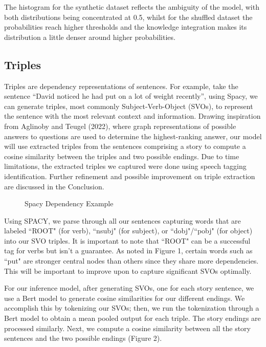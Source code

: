 \documentclass{article}
\begin{document}
\begin{multicols}{2}
The histogram for the synthetic dataset reflects the ambiguity of the model, with both distributions being concentrated at 0.5, whilst for the shuffled dataset the probabilities reach higher thresholds and the knowledge integration makes its distribution a little denser around higher probabilities.

\subsection{Triples}
Triples are dependency representations of sentences. For example, take the sentence ``David noticed he had put on a lot of weight recently'', using Spacy, we can generate triples, most commonly Subject-Verb-Object (SVOs), to represent the sentence with the most relevant context and information. Drawing inspiration from Aglinoby and Teugel (2022), where graph representations of possible answers to questions are used to determine the highest-ranking answer, our model will use extracted triples from the sentences comprising a story to compute a cosine similarity between the triples and two possible endings. Due to time limitations, the extracted triples we captured were done using speech tagging identification. Further refinement and possible improvement on triple extraction are discussed in the Conclusion.

\begin{figure}[H]
    \centering
    \caption{Spacy Dependency Example}
\end{figure}

Using SPACY, we parse through all our sentences capturing words that are labeled ``ROOT" (for verb), ``nsubj" (for subject), or ``dobj"/``pobj" (for object) into our SVO triples. It is important to note that ``ROOT" can be a successful tag for verbs but isn't a guarantee. As noted in Figure 1, certain words 
such as ``put" are stronger central nodes than others since they share more dependencies.  This will be important to improve upon to capture significant SVOs optimally.

For our inference model, after generating SVOs, one for each story sentence, we use a Bert model to generate cosine similarities for our different endings. We accomplish this by tokenizing our SVOs; then, we run the tokenization through a Bert model to obtain a mean pooled output for each triple. The story endings are processed similarly. Next, we compute a cosine similarity between all the story sentences and the two possible endings (Figure 2).


\end{multicols}
\end{document}
